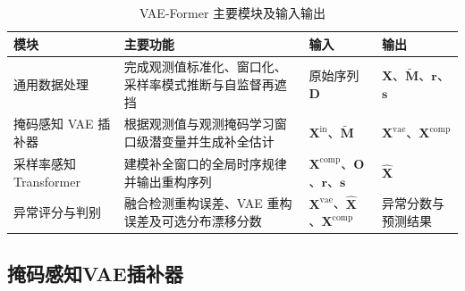 \documentclass[bachelor, vlined]{DissertUESTC}
\begin{document}
    \begin{table}[htbp]
        \centering
        \caption{VAE-Former 主要模块及输入输出}
        \label{tab:vae_transformer_modules}
        \begin{tabular}{p{2.4cm} p{4.8cm} p{2.8cm} p{2.8cm}}
            \hline
            模块 & 主要功能 & 输入 & 输出 \\
            \hline
            通用数据处理 & 完成观测值标准化、窗口化、采样率模式推断与自监督再遮挡 & 原始序列 $\mathbf{D}$ & $\mathbf{X}$、$\widetilde{\mathbf{M}}$、$\mathbf{r}$、$\mathbf{s}$ \\
            掩码感知 VAE 插补器 & 根据观测值与观测掩码学习窗口级潜变量并生成补全估计 & $\mathbf{X}^{\mathrm{in}}$、$\widetilde{\mathbf{M}}$ & $\mathbf{X}^{\mathrm{vae}}$、$\mathbf{X}^{\mathrm{comp}}$ \\
            采样率感知 Transformer & 建模补全窗口的全局时序规律并输出重构序列 & $\mathbf{X}^{\mathrm{comp}}$、$\mathbf{O}$、$\mathbf{r}$、$\mathbf{s}$ & $\hat{\mathbf{X}}$ \\
            异常评分与判别 & 融合检测重构误差、VAE 重构误差及可选分布漂移分数 & $\mathbf{X}^{\mathrm{vae}}$、$\hat{\mathbf{X}}$、$\mathbf{X}^{\mathrm{comp}}$ & 异常分数与预测结果 \\
            \hline
        \end{tabular}
    \end{table}

    \subsection{掩码感知VAE插补器}
\end{document}

